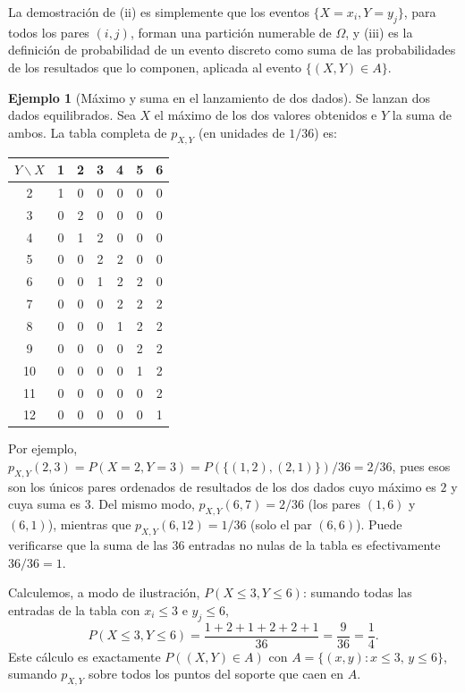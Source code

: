 \documentclass[11pt,a4paper]{article}
\theoremstyle{plain}
\theoremstyle{definition}
\newtheorem{ejemplo}[teorema]{Ejemplo}
\theoremstyle{remark}
\begin{document}
La demostración de (ii) es simplemente que los eventos $\{X=x_i, Y=y_j\}$, para todos los pares $(i,j)$, forman una partición numerable de $\Omega$, y (iii) es la definición de probabilidad de un evento discreto como suma de las probabilidades de los resultados que lo componen, aplicada al evento $\{(X,Y)\in A\}$.

\begin{ejemplo}[Máximo y suma en el lanzamiento de dos dados]\label{ej:dados}
Se lanzan dos dados equilibrados. Sea $X$ el máximo de los dos valores obtenidos e $Y$ la suma de ambos. La tabla completa de $p_{X,Y}$ (en unidades de $1/36$) es:

\begin{table}[h!]
\centering
\begin{tabular}{c|cccccc}
\toprule
$Y\backslash X$ & 1 & 2 & 3 & 4 & 5 & 6 \\
\midrule
2  & 1 & 0 & 0 & 0 & 0 & 0 \\
3  & 0 & 2 & 0 & 0 & 0 & 0 \\
4  & 0 & 1 & 2 & 0 & 0 & 0 \\
5  & 0 & 0 & 2 & 2 & 0 & 0 \\
6  & 0 & 0 & 1 & 2 & 2 & 0 \\
7  & 0 & 0 & 0 & 2 & 2 & 2 \\
8  & 0 & 0 & 0 & 1 & 2 & 2 \\
9  & 0 & 0 & 0 & 0 & 2 & 2 \\
10 & 0 & 0 & 0 & 0 & 1 & 2 \\
11 & 0 & 0 & 0 & 0 & 0 & 2 \\
12 & 0 & 0 & 0 & 0 & 0 & 1 \\
\bottomrule
\end{tabular}
\end{table}

Por ejemplo, $p_{X,Y}(2,3) = P(X=2,Y=3) = P(\{(1,2),(2,1)\})/36 = 2/36$, pues esos son los únicos pares ordenados de resultados de los dos dados cuyo máximo es $2$ y cuya suma es $3$. Del mismo modo, $p_{X,Y}(6,7)=2/36$ (los pares $(1,6)$ y $(6,1)$), mientras que $p_{X,Y}(6,12)=1/36$ (solo el par $(6,6)$). Puede verificarse que la suma de las $36$ entradas no nulas de la tabla es efectivamente $36/36=1$.

Calculemos, a modo de ilustración, $P(X\le 3, Y\le 6)$: sumando todas las entradas de la tabla con $x_i\le 3$ e $y_j\le 6$,
\[
P(X\le3,Y\le6) = \frac{1+2+1+2+2+1}{36} = \frac{9}{36} = \frac14.
\]
Este cálculo es exactamente $P((X,Y)\in A)$ con $A=\{(x,y):x\le3,\,y\le6\}$, sumando $p_{X,Y}$ sobre todos los puntos del soporte que caen en $A$.
\end{ejemplo}
\end{document}
